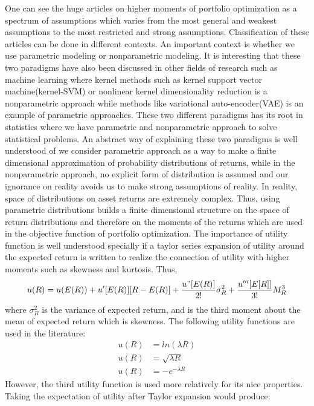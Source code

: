 \documentclass[12pt,a4paper]{article}
\numberwithin{equation}{section}
\begin{document}
One can see the huge articles on higher moments of portfolio optimization as a spectrum of assumptions which varies from the most general and weakest assumptions to the most restricted and strong assumptions. Classification of these articles can be done in different contexts. An important context is whether we use parametric modeling or nonparametric modeling. It is interesting that these two paradigms have also been discussed in other fields of research such as machine learning where kernel methods such as kernel support vector machine(kernel-SVM) or nonlinear kernel dimensionality reduction is a nonparametric approach while methods like variational auto-encoder(VAE) is an example of parametric approaches. These two different paradigms has its root in statistics where we have parametric and nonparametric approach to solve statistical problems. An abstract way of explaining these two paradigms is well understood of we consider parametric approach as a way to make a finite dimensional approximation of probability distributions of returns, while in the nonparametric approach, no explicit form of distribution is assumed and our ignorance on reality avoids us to make strong assumptions of reality. In reality, space of distributions on asset returns are extremely complex. Thus, using parametric distributions builds a finite dimensional structure on the space of return distributions and therefore on the moments of the returns which are used in the objective function of portfolio optimization. The importance of utility function is well understood specially if a taylor series expansion of utility around the expected return is written to realize the connection of utility with higher moments such as skewness and kurtosis. Thus,
\begin{equation}
u(R)=u(E(R))+u'[E(R)][R-E(R)]+\frac{ u"[E(R)]}{{2!}}  \sigma^2_R+\frac{u'''[E[R]]}{3!} M^3_R
\end{equation}        
where $\sigma^2_R$   is the variance of expected return, and is the third moment about the mean of expected return which is skewness. The following utility functions are used in the literature:
\begin{equation}
\begin{split}
u(R)&=ln(\lambda R)  \\
u(R)&=\sqrt{\lambda R}  \\
u(R)&=-e^{-\lambda R}
\end{split}
\end{equation}
However, the third utility function is used more relatively for its nice properties.  Taking the expectation of utility after Taylor expansion would produce:
\end{document}
